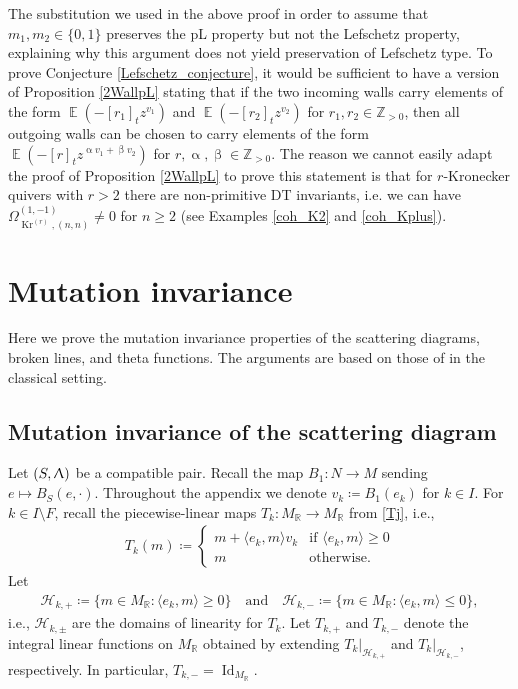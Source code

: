 \documentclass{amsart}
\DeclareMathOperator{\moKr}{Kr}
\newcommand{\Kr}[1]{\moKr^{(#1)}}
\DeclareMathOperator{\Id}{Id}
\DeclareMathOperator{\EE}{\mathbb{E}}
\let\bb=\mathbb
\let\rar=\rightarrow
\let\s=\mathcal
\renewcommand{\alpha}{\upalpha}
\renewcommand{\beta}{\upbeta}
\renewcommand{\Lambda}{\Uplambda}
\theoremstyle{plain}%
\theoremstyle{definition}
\theoremstyle{remark}
\begin{document}
The substitution we used in the above proof in order to assume that $m_1,m_2\in \{0,1\}$ preserves the pL property but not the Lefschetz property, explaining why this argument does not yield preservation of Lefschetz type.  To prove Conjecture \ref{Lefschetz_conjecture}, it would be sufficient to have a version of Proposition \ref{2WallpL} stating that if the two incoming walls carry elements of the form $\EE(-[r_1]_tz^{v_1})$ and $\EE(-[r_2]_tz^{v_2})$ for $r_1,r_2\in \mathbb{Z}_{>0}$, then all outgoing walls can be chosen to carry elements of the form $\EE(-[r]_tz^{\alpha v_1+\beta v_2})$ for $r,\alpha,\beta\in\mathbb{Z}_{>0}$.  The reason we cannot easily adapt the proof of Proposition \ref{2WallpL} to prove this statement is that for $r$-Kronecker quivers with $r>2$ there are non-primitive DT invariants, i.e. we can have $\Omega_{\Kr{r},(n,n)}^{(1,-1)}\neq 0$ for $n\geq 2$ (see Examples \ref{coh_K2} and \ref{coh_Kplus}).
\appendix




\section{Mutation invariance}



Here we prove the mutation invariance properties of the scattering diagrams, broken lines, and theta functions.  The arguments are based on those of \cite{GHKK} in the classical setting.

\subsection{Mutation invariance of the scattering diagram}\label{MutInvSect}

Let $(S,\Lambda)$ be a compatible pair.  Recall the map $B_{1}\colon N\rightarrow M$ sending $e\mapsto B_S(e,\cdot)$.  Throughout the appendix we denote $v_k\coloneqq B_{1}(e_{k})$ for $k\in I$.  For $k\in I\setminus F$, recall the piecewise-linear maps $T_k\colon M_{\bb{R}}\rar M_{\bb{R}}$ from \eqref{Tj}, i.e.,
\begin{align*}
    T_k(m)\coloneqq 
    \begin{cases} m+\langle e_k,m\rangle v_k & \mbox{if $\langle e_k,m\rangle \geq 0$} \\ m & \mbox{otherwise.}
    \end{cases}
\end{align*}
Let
\begin{align*}
    \s{H}_{k,+}\coloneqq \{m\in M_{\bb{R}}\colon\langle e_k,m\rangle \geq 0\} \quad \mbox{and} \quad  \s{H}_{k,-}\coloneqq \{m\in M_{\bb{R}}\colon\langle e_k,m\rangle \leq 0\},
\end{align*}
i.e., $\s{H}_{k,\pm}$ are the domains of linearity for $T_k$.  
Let $T_{k,+}$ and $T_{k,-}$ denote the integral linear functions on $M_{\bb{R}}$ obtained by extending $T_k|_{\s{H}_{k,+}}$ and $T_k|_{\s{H}_{k,-}}$, respectively.  In particular, $T_{k,-}=\Id_{M_{\mathbb{R}}}$.  
\end{document}
